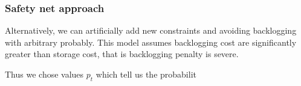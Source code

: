 \subsubsection{Safety net approach}
\label{subs:Safety net approach}

Alternatively, we can artificially add new constraints and avoiding backlogging with arbitrary probably. This model assumes backlogging cost are significantly greater than storage cost, that is backlogging penalty is severe.

Thus we chose values $p_t$ which tell us the probabilit 

